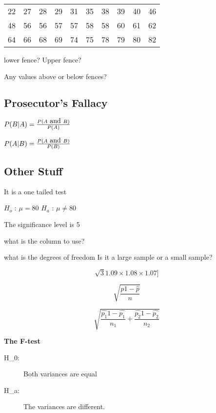 \documentclass[]{report}
\begin{document}
\begin{enumerate}[(i)]
\begin{center}
\begin{tabular}{cccccccccc}
	22 & 27 & 28 & 29 & 31 & 35 & 38 & 39 & 40 & 46 \\ 	
	48 & 56 & 56 & 57 & 57 & 58 & 58 & 60 & 61 & 62 \\ 	
	64 & 66 & 68 & 69 & 74 & 75 & 78 & 79 & 80 & 82 \\ \hline

\end{tabular} 
\end{center}


lower fence?
Upper fence?

Any values above or below fences?




\subsection{ Prosecutor's Fallacy}



$	P(B|A) = { P(A \mbox{ and } B) \over P(A) } $

$	P(A|B) = { P( A \mbox{ and }B) \over P(B) } $










\subsection{Other Stuff}							

It is a one tailed test

$H_o$  : $\mu = 80 $
$H_a$  : $\mu \neq 80$ 

The significance level is 5%

what is the column to use?

what is the degrees of freedom 
Is it a large sample or a small sample?



\[	\sqrt{3}{1.09 \times 1.08 \times 1.07}]\]


\[	\sqrt{ \frac{\hat{p} 1- \hat{p}}{n} }\]


\[	\sqrt{ \frac{\hat{p_1} 1- \hat{p_1}}{n_1} + \frac{\hat{p_2} 1- \hat{p_2}}{n_2}}\]


\textbf{The F-test}
\begin{description}
	\item[H\_0:] Both variances are equal
	\item[H\_a:] The variances are different.
\end{description}



\end{enumerate}
\end{document}
